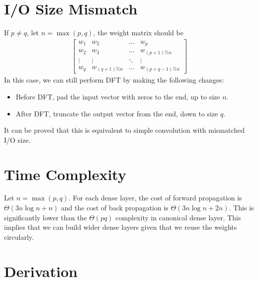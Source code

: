 \documentclass[12pt]{article}
\begin{document}
\section{I/O Size Mismatch}

If $p \neq q$, let $n = \max{(p,q)}$, the weight matrix should be 
\begin{align*}
	\begin{bmatrix}
		w_1 & w_2 & \hdots & w_p \\
		w_2 & w_3 & \hdots & w_{(p+1)\%n} \\
		\vdots & \vdots & \ddots & \vdots \\
		w_q & w_{(q+1)\%n} & \hdots & w_{(p+q-1)\%n}
	\end{bmatrix}
\end{align*}
In this case, we can still perform DFT by making the following changes: 
\begin{itemize}
\item Before DFT, pad the input vector with zeros to the end, up to size $n$. 
\item After DFT, truncate the output vector from the end, down to size $q$. 
\end{itemize}
It can be proved that this is equivalent to simple convolution with mismatched I/O size. 

\section{Time Complexity}

Let $n = \max{(p,q)}$. For each dense layer, the cost of forward propagation is $\Theta(3n\log{n} + n)$ and the cost of back propagation is $\Theta(3n\log{n} + 2n)$. This is significantly lower than the $\Theta(pq)$ complexity in canonical dense layer. This implies that we can build wider dense layers given that we reuse the weights circularly. 

\section{Derivation}
\end{document}
